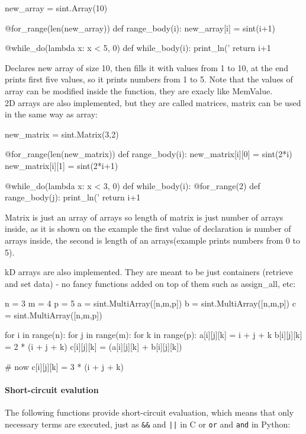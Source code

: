 \begin{mylisting}
new_array = sint.Array(10)

@for_range(len(new_array))
def range_body(i):
    new_array[i] = sint(i+1)

@while_do(lambda x: x < 5, 0)
def while_body(i):
    print_ln('%
    return i+1
\end{mylisting}
Declares new array of size 10, then fills it with values from 1 to 10, at the end prints first five values, so it prints numbers from 1 to 5. Note that the values of array can be modified inside the function, they are exacly like MemValue. \\
2D arrays are also implemented, but they are called matrices, matrix can be used in the same way as array:
\begin{mylisting}
new_matrix = sint.Matrix(3,2)

@for_range(len(new_matrix))
def range_body(i):
    new_matrix[i][0] = sint(2*i)
    new_matrix[i][1] = sint(2*i+1)

@while_do(lambda x: x < 3, 0)
def while_body(i):
    @for_range(2)
    def range_body(j):
        print_ln('%
    return i+1
\end{mylisting}
Matrix is just an array of arrays so length of matrix is just number of arrays inside, as it is shown on the example the first value of declaration is number of arrays inside, the second is length of an arrays(example prints numbers from 0 to 5).

kD arrays are also implemented. They are meant to be just containers (retrieve and set data) - no fancy functions added on top of them such as assign_all, etc:

\begin{mylisting}
n = 3
m = 4
p = 5
a = sint.MultiArray([n,m,p])
b = sint.MultiArray([n,m,p])
c = sint.MultiArray([n,m,p])

for i in range(n):
	for j in range(m):
		for k in range(p):
			a[i][j][k] = i + j + k
			b[i][j][k] = 2 * (i + j + k)
			c[i][j][k] = (a[i][j][k] + b[i][j][k])

# now c[i][j][k] = 3 * (i + j + k)
\end{mylisting}


\paragraph{Short-circuit evalution}
The following functions provide short-circuit evaluation, which means
that only necessary terms are executed, just as \verb+&&+ and
\verb+||+ in C or \verb+or+ and \verb+and+ in Python:

